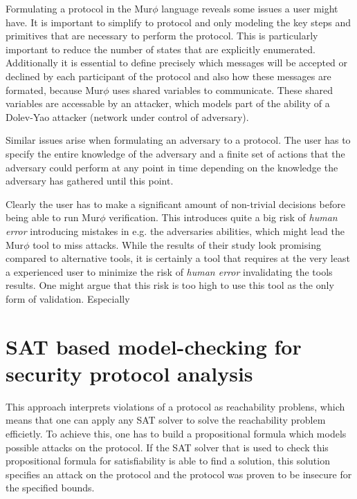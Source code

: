 \documentclass[a4paper,UKenglish]{lipics-v2018}
\def\murphi{Mur$\phi$ }
\begin{document}
Formulating a protocol in the \murphi language reveals some issues a user might have. It is important to simplify to protocol and only modeling the key steps and primitives that are necessary to perform the protocol. This is particularly important to reduce the number of states that are explicitly enumerated. Additionally it is essential to define precisely which messages will be accepted or declined by each participant of the protocol and also how these messages are formated, because \murphi uses shared variables to communicate. These shared variables are accessable by an attacker, which models part of the ability of a Dolev-Yao attacker (network under control of adversary).\cite{murphi}

Similar issues arise when formulating an adversary to a protocol. The user has to specify the entire knowledge of the adversary and a finite set of actions that the adversary could perform at any point in time depending on the knowledge the adversary has gathered until this point.\cite{murphi}

Clearly the user has to make a significant amount of non-trivial decisions before being able to run \murphi verification. This introduces quite a big risk of \textit{human error} introducing mistakes in e.g. the adversaries abilities, which might lead the \murphi tool to miss attacks. While the results of their study look promising compared to alternative tools, it is certainly a tool that requires at the very least a experienced user to minimize the risk of \textit{human error} invalidating the tools results. One might argue that this risk is too high to use this tool as the only form of validation. Especially






\section{SAT based model-checking for security protocol analysis}

This approach interprets violations of a protocol as reachability problens, which means that one can apply any SAT solver to solve the reachability problem efficietly. To achieve this, one has to build a propositional formula which models possible attacks on the protocol. If the SAT solver that is used to check this propositional formula for satisfiability is able to find a solution, this solution specifies an attack on the protocol and the protocol was proven to be insecure for the specified bounds.\cite{sat}
\end{document}
